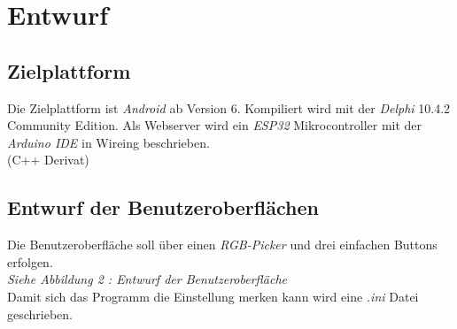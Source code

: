 \section{Entwurf}
\subsection{Zielplattform}
Die Zielplattform ist \textit{Android} ab Version 6. Kompiliert wird mit der \textit{Delphi} 10.4.2 Community Edition. Als Webserver wird ein \textit{ESP32} Mikrocontroller mit der \textit{Arduino IDE} in Wireing beschrieben. \\ (C++ Derivat)
\subsection{Entwurf der Benutzeroberflächen}
Die Benutzeroberfläche soll über einen \textit{RGB-Picker} und drei einfachen Buttons erfolgen.\\
\textit{Siehe Abbildung 2 : Entwurf der Benutzeroberfläche}\\
Damit sich das Programm die Einstellung merken kann wird eine \textit{.ini} Datei geschrieben.




